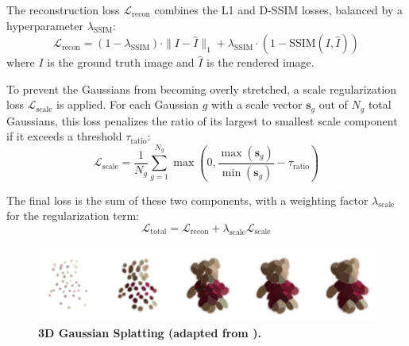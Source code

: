 The reconstruction loss $\mathcal{L}_{\text{recon}}$ combines the L1 and D-SSIM losses, balanced by a hyperparameter $\lambda_{\text{SSIM}}$:
\begin{equation}
	\mathcal{L}_{\text{recon}} = (1 - \lambda_{\text{SSIM}}) \cdot \|I - \hat{I}\|_1 + \lambda_{\text{SSIM}} \cdot \left(1 - \text{SSIM}(I, \hat{I})\right)
\end{equation}
where $I$ is the ground truth image and $\hat{I}$ is the rendered image.

To prevent the Gaussians from becoming overly stretched, a scale regularization loss $\mathcal{L}_{\text{scale}}$ is applied. For each Gaussian $g$ with a scale vector $\mathbf{s}_g$ out of $N_g$ total Gaussians, this loss penalizes the ratio of its largest to smallest scale component if it exceeds a threshold $\tau_{\text{ratio}}$:
\begin{equation}
	\mathcal{L}_{\text{scale}} = \frac{1}{N_g} \sum_{g=1}^{N_g} \max \left( 0, \frac{\max(\mathbf{s}_g)}{\min(\mathbf{s}_g)} - \tau_{\text{ratio}} \right)
\end{equation}

The final loss is the sum of these two components, with a weighting factor $\lambda_{\text{scale}}$ for the regularization term:
\begin{equation}
	\mathcal{L}_{\text{total}} = \mathcal{L}_{\text{recon}} + \lambda_{\text{scale}}\mathcal{L}_{\text{scale}}
\end{equation}

\begin{figure}[t]
	\centering
	\includegraphics[width=\linewidth]{figures/gaussian_splatting.png}
	\caption{\bfseries 3D Gaussian Splatting (adapted from \cite{dalal_gaussian_2024}).}
	\label{fig:gaussian_splatting}
\end{figure}
